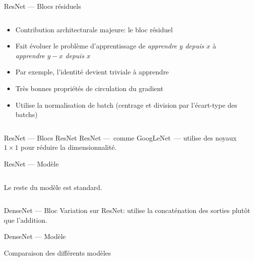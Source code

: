 \begin{frame}{ResNet --- Blocs résiduels}
  \begin{columns}
    \begin{column}{0.5\textwidth}
      \begin{itemize}
        \item Contribution architecturale majeure: le bloc résiduel
        \item Fait évoluer le problème d'apprentissage de \emph{apprendre $y$ depuis $x$} à \emph{apprendre $y - x$ depuis $x$}
        \item Par exemple, l'identité devient triviale à apprendre
        \item Très bonnes propriétés de circulation du gradient
        \item Utilise la normalisation de batch (centrage et division par l'écart-type des batchs)
      \end{itemize}
    \end{column}
    \begin{column}{0.5\textwidth}
    \end{column}
  \end{columns}
\end{frame}

\begin{frame}{ResNet --- Blocs ResNet}
  ResNet ---~comme GoogLeNet~--- utilise des noyaux $1 \times 1$ pour réduire la dimensionnalité.

\end{frame}

\begin{frame}{ResNet --- Modèle}
  \begin{columns}
    \begin{column}{0.5\textwidth}
      Le reste du modèle est standard.
    \end{column}
    \begin{column}{0.5\textwidth}
    \end{column}
  \end{columns}
\end{frame}

\begin{frame}{DenseNet --- Bloc}
  Variation sur ResNet: utilise la concaténation des sorties plutôt que l'addition.

\end{frame}

\begin{frame}{DenseNet --- Modèle}
\end{frame}

\begin{frame}{Comparaison des différents modèles}
\end{frame}

